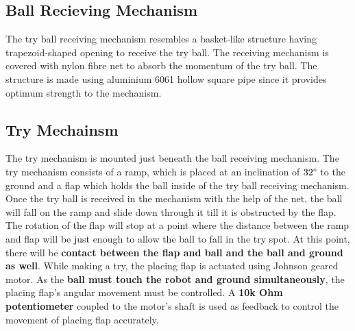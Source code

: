 

    \subsection{Ball Recieving Mechanism}
        The try ball receiving mechanism resembles a basket-like structure having trapezoid-shaped opening to receive the try ball. The receiving mechanism is 
        covered with nylon fibre net to absorb the momentum of the try ball. The structure is made using aluminium 6061 hollow square pipe since it provides 
        optimum strength to the mechanism.
    
    \subsection{Try Mechainsm}
        The try mechanism is mounted just beneath the ball receiving mechanism. The try mechanism consists of a ramp, which is placed at an 
        inclination of \textbf{$32\degree$} to the ground and a flap which holds the ball inside of the try ball receiving mechanism. Once the try ball is received 
        in the mechanism with the help of the net, the ball will fall on the ramp and slide down through it till it is obstructed by the flap. 
        The rotation of the flap will stop at a point where the distance between the ramp and flap will be just enough to allow the ball to fall 
        in the try spot. At this point, there will be \textbf{contact between the flap and ball and the ball and ground as well}. While making a try, the 
        placing flap is actuated using Johnson geared motor. As the \textbf{ball must touch the robot and ground simultaneously}, the placing flap’s angular 
        movement must be controlled. A \textbf{10k Ohm potentiometer} coupled to the motor’s shaft is used as feedback to control the movement of placing 
        flap accurately.\\

